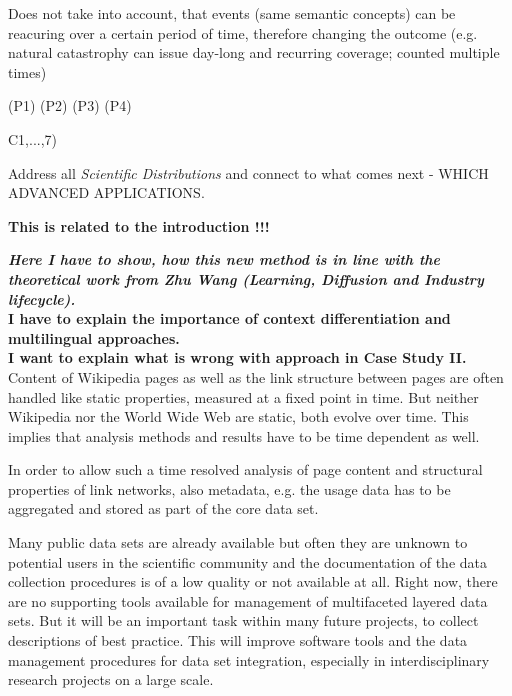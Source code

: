 \documentclass[a4paper,10pt]{scrbook}
\begin{document}
Does not take into account, that events (same semantic concepts) can be reacuring over a certain period of time, therefore changing the outcome (e.g. natural catastrophy can issue day-long and recurring coverage; counted multiple times)





(P1)
(P2)
(P3)
(P4)

C1,...,7)

Address all \textit{Scientific Distributions} and connect to what comes next - WHICH ADVANCED APPLICATIONS.

\textbf{This is related to the introduction !!!}










\textbf{\textit{Here I have to show, how this new method is in line with the theoretical work from Zhu Wang (Learning, Diffusion and Industry lifecycle).}} \\

\textbf{I have to explain the importance of context differentiation and multilingual approaches.} \\

\textbf{I want to explain what is wrong with approach in Case Study II.} \\

 
Content of Wikipedia pages as well as the link structure between
pages are often handled like static properties, measured at a
fixed point in time. But neither Wikipedia nor the World Wide Web are static,
both evolve over time. This implies that analysis methods and results have
to be time dependent as well.

In order to allow such a time resolved analysis of page content and structural
properties of link networks, also metadata, e.g. the usage data has to be
aggregated and stored as part of the core data set.
 
Many public data sets are already available but often they are unknown to
potential users in the scientific community and the documentation of the data
collection procedures is of a low quality or not available at all.
Right now, there are no supporting tools available for management of 
multifaceted layered data sets. But it will be an important task within many
future projects, to collect descriptions of best practice. This will
improve software tools and the data management procedures for data set
integration, especially in interdisciplinary research projects on a large 
scale.
\end{document}
